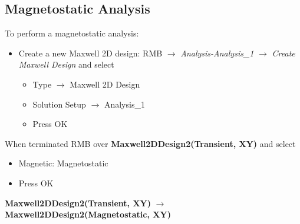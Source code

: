 \subsection{Magnetostatic Analysis} 
To perform a magnetostatic analysis:
\begin{itemize}
	\item[--] Create a new Maxwell 2D design: RMB $\rightarrow$ \textit{Analysis-Analysis\_1} $\rightarrow$ \textit{Create Maxwell Design} and select
	\begin{itemize}
		\item[--] Type $\rightarrow$ Maxwell 2D Design
		\item[--] Solution Setup $\rightarrow$ Analysis\_1
		\item[--] Press OK
	\end{itemize}
\end{itemize}
When terminated RMB over \textbf{Maxwell2DDesign2(Transient, XY)} and select
\begin{itemize}
	\item[--] Magnetic: Magnetostatic
	\item[--] Press OK
\end{itemize}
\begin{mybox}
	\textbf{Maxwell2DDesign2(Transient, XY)} $\rightarrow$ \textbf{Maxwell2DDesign2(Magnetostatic, XY)}
\end{mybox}

\vspace{10mm}

